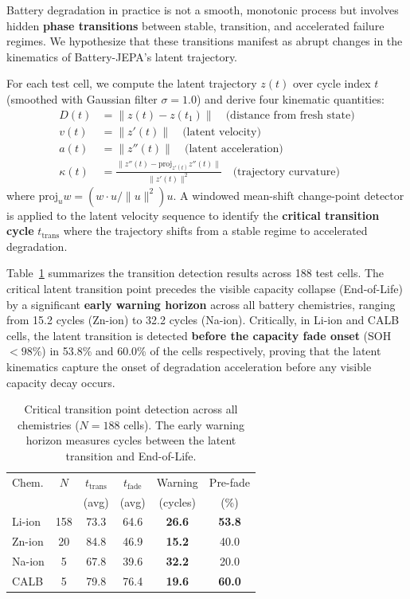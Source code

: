 \documentclass[a4paper,fleqn]{cas-dc}
\begin{document}
Battery degradation in practice is not a smooth, monotonic process but involves hidden \textbf{phase transitions} between stable, transition, and accelerated failure regimes. We hypothesize that these transitions manifest as abrupt changes in the kinematics of Battery-JEPA's latent trajectory.

For each test cell, we compute the latent trajectory $z(t)$ over cycle index $t$ (smoothed with Gaussian filter $\sigma = 1.0$) and derive four kinematic quantities:
\begin{align}
    D(t) &= \|z(t) - z(t_1)\| \quad \text{(distance from fresh state)} \\
    v(t) &= \|z'(t)\| \quad \text{(latent velocity)} \\
    a(t) &= \|z''(t)\| \quad \text{(latent acceleration)} \\
    \kappa(t) &= \frac{\|z''(t) - \text{proj}_{z'(t)} z''(t)\|}{\|z'(t)\|^2} \quad \text{(trajectory curvature)}
\end{align}
where $\text{proj}_u w = (w \cdot u / \|u\|^2) u$. A windowed mean-shift change-point detector is applied to the latent velocity sequence to identify the \textbf{critical transition cycle} $t_{\text{trans}}$ where the trajectory shifts from a stable regime to accelerated degradation.

Table~\ref{tbl:transitions} summarizes the transition detection results across 188 test cells. The critical latent transition point precedes the visible capacity collapse (End-of-Life) by a significant \textbf{early warning horizon} across all battery chemistries, ranging from 15.2 cycles (Zn-ion) to 32.2 cycles (Na-ion). Critically, in Li-ion and CALB cells, the latent transition is detected \textbf{before the capacity fade onset} (SOH $< 98\%$) in 53.8\% and 60.0\% of the cells respectively, proving that the latent kinematics capture the onset of degradation acceleration before any visible capacity decay occurs.

\begin{table}[t]
\caption{Critical transition point detection across all chemistries ($N = 188$ cells). The early warning horizon measures cycles between the latent transition and End-of-Life.}
\label{tbl:transitions}
\centering
\footnotesize
\begin{tabular}{lccccc}
\toprule
Chem. & $N$ & $t_{\text{trans}}$ & $t_{\text{fade}}$ & Warning & Pre-fade \\
 & & (avg) & (avg) & (cycles) & (\%) \\
\midrule
Li-ion & 158 & 73.3 & 64.6 & \textbf{26.6} & \textbf{53.8} \\
Zn-ion & 20 & 84.8 & 46.9 & \textbf{15.2} & 40.0 \\
Na-ion & 5 & 67.8 & 39.6 & \textbf{32.2} & 20.0 \\
CALB & 5 & 79.8 & 76.4 & \textbf{19.6} & \textbf{60.0} \\
\bottomrule
\end{tabular}
\end{table}
\end{document}
